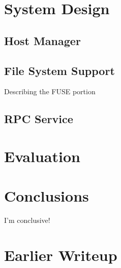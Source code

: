 \documentclass[preprint]{sig-alternate-10pt}
\begin{document}
\section{System Design}
    

\subsection{Host Manager}
    

\subsection{File System Support}
Describing the FUSE portion
    

\subsection{RPC Service}
    


\section{Evaluation}
    

\section{Conclusions}
I'm conclusive!
    

\section{Earlier Writeup}




%


%








\end{document}
